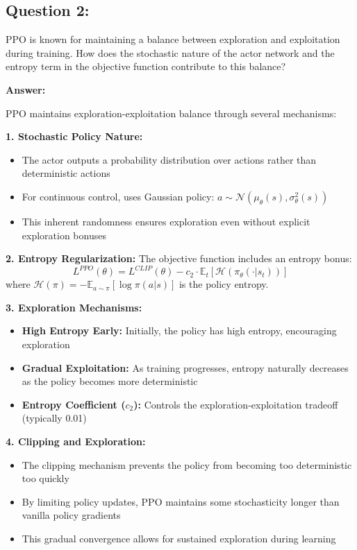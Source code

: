 \documentclass[12pt]{article}
\begin{document}
{{{\subsection{Question 2:} PPO is known for maintaining a balance between exploration and exploitation during training. How does the stochastic nature of the actor network and the entropy term in the objective function contribute to this balance?

\textbf{Answer:}

PPO maintains exploration-exploitation balance through several mechanisms:

\textbf{1. Stochastic Policy Nature:}
\begin{itemize}
    \item The actor outputs a probability distribution over actions rather than deterministic actions
    \item For continuous control, uses Gaussian policy: $a \sim \mathcal{N}(\mu_\theta(s), \sigma_\theta^2(s))$
    \item This inherent randomness ensures exploration even without explicit exploration bonuses
\end{itemize}

\textbf{2. Entropy Regularization:}
The objective function includes an entropy bonus:
\[
L^{PPO}(\theta) = L^{CLIP}(\theta) - c_2 \cdot \mathbb{E}_t[\mathcal{H}(\pi_\theta(\cdot|s_t))]
\]
where $\mathcal{H}(\pi) = -\mathbb{E}_{a \sim \pi}[\log \pi(a|s)]$ is the policy entropy.

\textbf{3. Exploration Mechanisms:}
\begin{itemize}
    \item \textbf{High Entropy Early:} Initially, the policy has high entropy, encouraging exploration
    \item \textbf{Gradual Exploitation:} As training progresses, entropy naturally decreases as the policy becomes more deterministic
    \item \textbf{Entropy Coefficient ($c_2$):} Controls the exploration-exploitation tradeoff (typically 0.01)
\end{itemize}

\textbf{4. Clipping and Exploration:}
\begin{itemize}
    \item The clipping mechanism prevents the policy from becoming too deterministic too quickly
    \item By limiting policy updates, PPO maintains some stochasticity longer than vanilla policy gradients
    \item This gradual convergence allows for sustained exploration during learning
\end{itemize}

}}}
\end{document}
